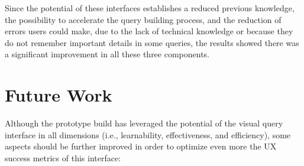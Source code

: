 Since the potential of these interfaces establishes a reduced previous knowledge, the possibility to accelerate the query building process, and the reduction of errors users could make, due to the lack of technical knowledge or because they do not remember important details in some queries, the results showed there was a significant improvement in all these three components.


\section{Future Work}
\label{sec:future_work}

Although the prototype build has leveraged the potential of the visual query interface in all dimensions (i.e., learnability, effectiveness, and efficiency), some aspects should be further improved in order to optimize even more the \gls{UX} success metrics of this interface:

